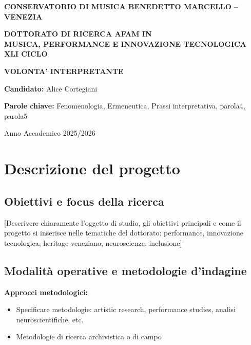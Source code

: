 \documentclass[11pt,a4paper]{article}
\begin{document}
\begin{center}
    {\Large\textbf{CONSERVATORIO DI MUSICA BENEDETTO MARCELLO -- VENEZIA}}

    \vspace{1cm}

    {\large\textbf{DOTTORATO DI RICERCA AFAM IN\\MUSICA, PERFORMANCE E INNOVAZIONE TECNOLOGICA\\XLI CICLO}}

    \vspace{1.5cm}

    {\LARGE\textbf{VOLONTA' INTERPRETANTE}}

    \vspace{1cm}

    \textbf{Candidato:} Alice Cortegiani

    \vspace{0.5cm}

    \textbf{Parole chiave:} Fenomenologia, Ermeneutica, Prassi interpretativa, parola4, parola5

    \vspace{1cm}

    Anno Accademico 2025/2026
\end{center}

\newpage
{}

\section{Descrizione del progetto}

\subsection{Obiettivi e focus della ricerca}
[Descrivere chiaramente l'oggetto di studio, gli obiettivi principali e come il progetto si inserisce nelle tematiche del dottorato: performance, innovazione tecnologica, heritage veneziano, neuroscienze, inclusione]

\subsection{Modalità operative e metodologie d'indagine}
\textbf{Approcci metodologici:}
\begin{itemize}[leftmargin=1cm]
    \item Specificare metodologie: artistic research, performance studies, analisi neuroscientifiche, etc.
    \item Metodologie di ricerca archivistica o di campo
\end{itemize}
\end{document}
